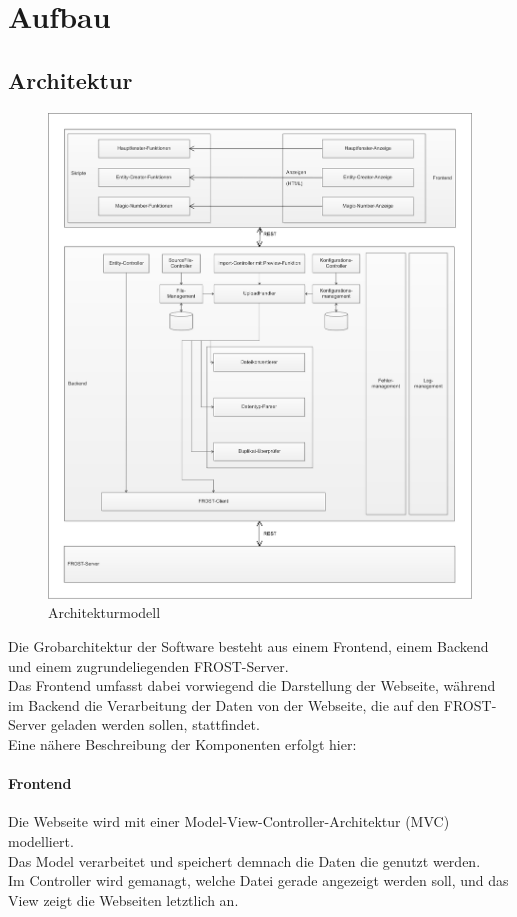 \section{Aufbau}

\subsection{Architektur}
\begin{figure}[htbp]
\centering
\includegraphics[scale=0.44]{uml/eps/architektur.eps}
\caption{\label{fig:architektur} Architekturmodell}
\end{figure}
\noindent Die Grobarchitektur der Software besteht aus einem Frontend, einem Backend und einem zugrundeliegenden FROST-Server.\\
 Das Frontend umfasst dabei vorwiegend die Darstellung der Webseite, während im Backend die Verarbeitung der Daten von der Webseite, die auf den FROST-Server geladen werden sollen, stattfindet. \\
 Eine nähere Beschreibung der Komponenten erfolgt hier:

\paragraph{Frontend}
Die Webseite wird mit einer Model-View-Controller-Architektur (MVC) modelliert.\\
Das Model verarbeitet und speichert demnach die Daten die genutzt werden.\\
Im Controller wird gemanagt, welche Datei gerade angezeigt werden soll, und das View zeigt die Webseiten letztlich an.

